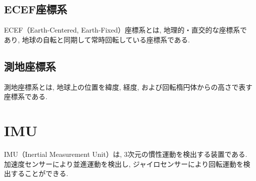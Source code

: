 
\subsection{ECEF座標系}
ECEF（Earth-Centered, Earth-Fixed）座標系とは, 地理的・直交的な座標系であり, 地球の自転と同期して常時回転している座標系である.

\subsection{測地座標系}
測地座標系とは, 地球上の位置を緯度, 経度, および回転楕円体からの高さで表す座標系である.

\section{IMU}
IMU（Inertial Measurement Unit）は, 
3次元の慣性運動を検出する装置である. 
加速度センサーにより並進運動を検出し, 
ジャイロセンサーにより回転運動を検出することができる.

\newpage